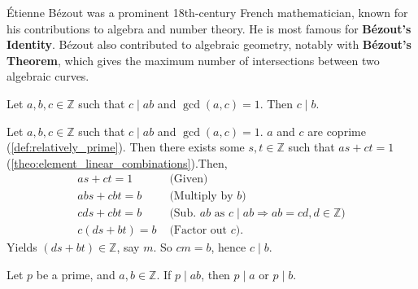 \begin{Tip}
    Étienne Bézout was a prominent 18th-century French mathematician, known for his contributions to algebra and number theory. He is most famous for \textbf{Bézout's Identity}. Bézout also contributed to algebraic geometry, notably with \textbf{Bézout's Theorem}, which gives the maximum number of intersections between two algebraic curves.
\end{Tip}

\newpage 

\begin{theo}

    \label{theo:cancellation_of_gcd}

    Let \( a, b, c \in \mathbb{Z} \) such that \( c \mid ab \) and \( \gcd(a, c) = 1 \). Then \( c \mid b \).
\end{theo}

\begin{Proof}

    Let $a,b,c\in\mathbb{Z}$ such that $c\mid ab$ and $\gcd(a,c)=1$. $a$ and $c$ are coprime (\ref{def:relatively_prime}). Then there exists some $s,t\in\mathbb{Z}$
    such that $as+ct=1$ (\ref{theo:element_linear_combinations}).Then, 
    \begin{align*}
        as+ct=1 & \text{ (Given)}\\
        abs + cbt = b & \text{ (Multiply by $b$)}\\
        cds + cbt = b & \text{ (Sub. $ab$ as $c\mid ab\Rightarrow ab = cd,d\in\mathbb{Z}$)}\\
        c(ds+bt)=b & \text{ (Factor out $c$).}
    \end{align*}
    Yields $(ds+bt)\in\mathbb{Z}$, say $m$. So $cm = b$, hence $c\mid b$.
\end{Proof}

\begin{theo}

    Let \( p \) be a prime, and \( a, b \in \mathbb{Z} \). If \( p \mid ab \), then \( p \mid a \) or \( p \mid b \).
\end{theo}


